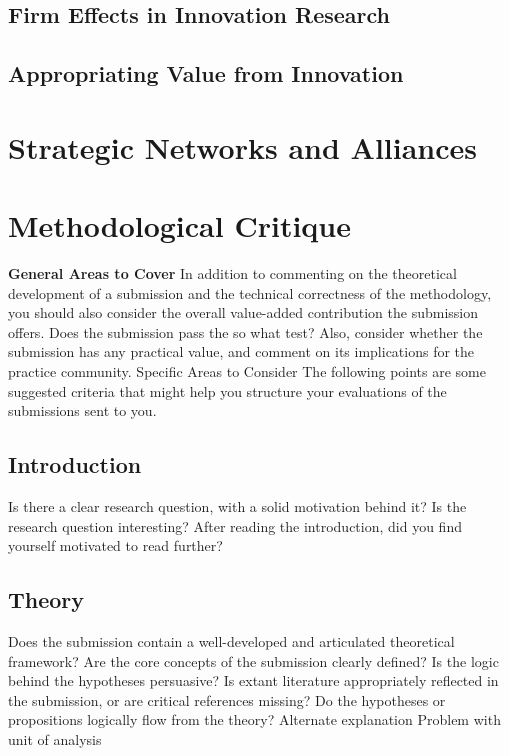 \documentclass[12pt,letterpaper]{article}
\begin{document}
\subsection{Firm Effects in Innovation Research}
\subsection{Appropriating Value from Innovation}


\newpage

\section{Strategic Networks and Alliances}


\newpage

\section{Methodological Critique}
\textbf{General Areas to Cover}
In addition to commenting on the theoretical development of a submission and the technical correctness of the methodology, you should also consider the overall value-added contribution the submission offers. Does the submission pass the so what test? Also, consider whether the submission has any practical value, and comment on its implications for the practice community.
Specific Areas to Consider
The following points are some suggested criteria that might help you structure your evaluations of the submissions sent to you.
\par
\subsection{Introduction}
Is there a clear research question, with a solid motivation behind it?
Is the research question interesting?
After reading the introduction, did you find yourself motivated to read further?
\par
\subsection{Theory}
Does the submission contain a well-developed and articulated theoretical framework? Are the core concepts of the submission clearly defined?
Is the logic behind the hypotheses persuasive?
Is extant literature appropriately reflected in the submission, or are critical references missing?
Do the hypotheses or propositions logically flow from the theory?
Alternate explanation
Problem with unit of analysis
\par
\end{document}
